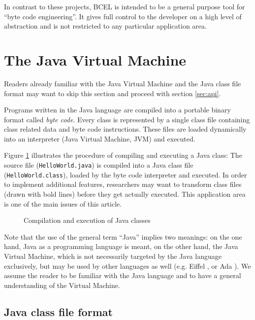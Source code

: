 \documentclass[12pt,twoside]{article}
\newcommand\jc{{\sffamily BCEL }}
\newcommand\jvm{{Java Virtual Machine }}
\newcommand\jvme{{Java Virtual Machine}}
\begin{document}
In contrast to these projects, \jc is intended to be a general purpose
tool  for ``byte  code engineering''.   It gives  full control  to the
developer on a high level of  abstraction and is not restricted to any
particular application area.

\section{The Java Virtual Machine}\label{sec:jvm}

Readers already familiar with the \jvm and the Java class file format
may want to skip this section and proceed with section \ref{sec:api}.

Programs written  in the  Java language are  compiled into  a portable
binary format called \emph{byte  code}.  Every class is represented by
a  single class  file  containing  class related  data  and byte  code
instructions. These  files are loaded dynamically  into an interpreter
(\jvme, JVM) and executed.

Figure  \ref{fig:jvm}  illustrates  the  procedure  of  compiling  and
executing a Java class:  The source file (\texttt{HelloWorld.java}) is
compiled into a Java class file (\texttt{HelloWorld.class}), loaded by
the  byte  code  interpreter  and  executed.  In  order  to  implement
additional  features, researchers  may want  to transform  class files
(drawn  with  bold lines)  before  they  get  actually executed.  This
application area is one of the main issues of this article.

\begin{figure}[htbp]
  \begin{center}
    \leavevmode
    \epsfxsize\textwidth
    \caption{Compilation and execution of Java classes}
    \label{fig:jvm}
  \end{center}
\end{figure}

Note that the  use of the general term  ``Java'' implies two meanings:
on the one hand, Java as a programming language is meant, on the other
hand, the Java  Virtual Machine, which is not  necessarily targeted by
the Java language  exclusively, but may be used  by other languages as
well (e.g.   Eiffel \cite{eiffel}, or Ada \cite{ada}).   We assume the
reader to  be familiar with  the Java language  and to have  a general
understanding of the Virtual Machine.

\subsection{Java class file format}\label{sec:format}
\end{document}

